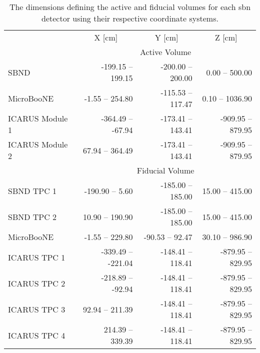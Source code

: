 \begin{table}[h!]
\begin{tabular}{lrrr}
 & \multicolumn{1}{c}{X [cm]} & \multicolumn{1}{c}{Y [cm]} & \multicolumn{1}{c}{Z [cm]} \\ \cline{2-4} 
 & \multicolumn{3}{c}{Active Volume} \\ \cline{2-4} 
SBND & -199.15 -- 199.15 & -200.00 -- 200.00 & 0.00 -- 500.00 \\
MicroBooNE & -1.55 -- 254.80 & -115.53 -- 117.47 & 0.10 -- 1036.90 \\
ICARUS Module 1 & -364.49 -- -67.94 & -173.41 -- 143.41 & -909.95 -- 879.95 \\
ICARUS Module 2 & 67.94 -- 364.49 & -173.41 -- 143.41 & -909.95 -- 879.95 \\ \cline{2-4} 
 & \multicolumn{3}{c}{Fiducial Volume} \\ \cline{2-4} 
SBND TPC 1 & -190.90 -- 5.60 & -185.00 -- 185.00 & 15.00 -- 415.00 \\
SBND TPC 2 & 10.90 -- 190.90 & -185.00 -- 185.00 & 15.00 -- 415.00 \\
MicroBooNE & -1.55 -- 229.80 & -90.53 -- 92.47 & 30.10 -- 986.90 \\
ICARUS TPC 1 & -339.49 -- -221.04 & -148.41 -- 118.41 & -879.95 -- 829.95 \\
ICARUS TPC 2 & -218.89 -- -92.94 & -148.41 -- 118.41 & -879.95 -- 829.95 \\
ICARUS TPC 3 & 92.94 -- 211.39 & -148.41 -- 118.41 & -879.95 -- 829.95 \\
ICARUS TPC 4 & 214.39 -- 339.39 & -148.41 -- 118.41 & -879.95 -- 829.95
\end{tabular}
\caption[The active and fiducial volumes of the \gls{sbn} detectors.]{The dimensions defining the active and fiducial volumes for each \gls{sbn} detector using their respective coordinate systems.} \label{table:active_and_fiducial_volumes}
\end{table}





%
